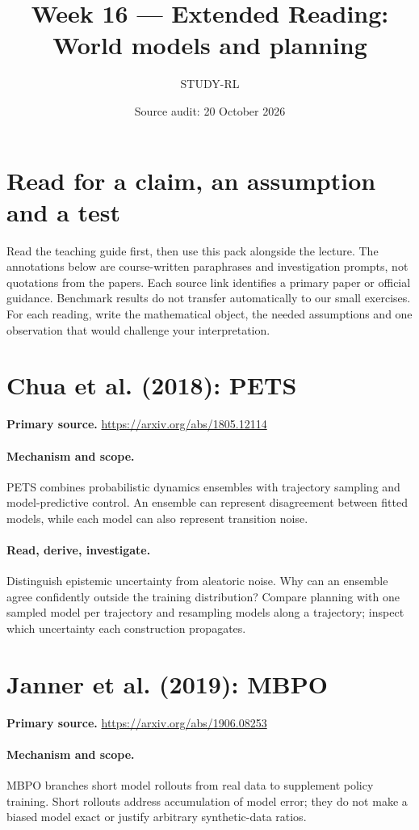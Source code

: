 \documentclass[11pt]{scrartcl}
\title{Week 16 --- Extended Reading: World models and planning}
\author{STUDY-RL}
\date{Source audit: 20 October 2026}
\begin{document}
\maketitle
\section*{Read for a claim, an assumption and a test}
Read the teaching guide first, then use this pack alongside the lecture.
The annotations below are course-written paraphrases and investigation prompts,
not quotations from the papers. Each source link identifies a primary paper
or official guidance. Benchmark results do not transfer automatically to our
small exercises. For each reading, write the mathematical object, the needed
assumptions and one observation that would challenge your interpretation.

\section{Chua et al. (2018): PETS}
\noindent\textbf{Primary source.} \url{https://arxiv.org/abs/1805.12114}

\paragraph{Mechanism and scope.} PETS combines probabilistic dynamics ensembles with trajectory sampling and model-predictive control. An ensemble can represent disagreement between fitted models, while each model can also represent transition noise.

\paragraph{Read, derive, investigate.} Distinguish epistemic uncertainty from aleatoric noise. Why can an ensemble agree confidently outside the training distribution? Compare planning with one sampled model per trajectory and resampling models along a trajectory; inspect which uncertainty each construction propagates.

\section{Janner et al. (2019): MBPO}
\noindent\textbf{Primary source.} \url{https://arxiv.org/abs/1906.08253}

\paragraph{Mechanism and scope.} MBPO branches short model rollouts from real data to supplement policy training. Short rollouts address accumulation of model error; they do not make a biased model exact or justify arbitrary synthetic-data ratios.
\end{document}
